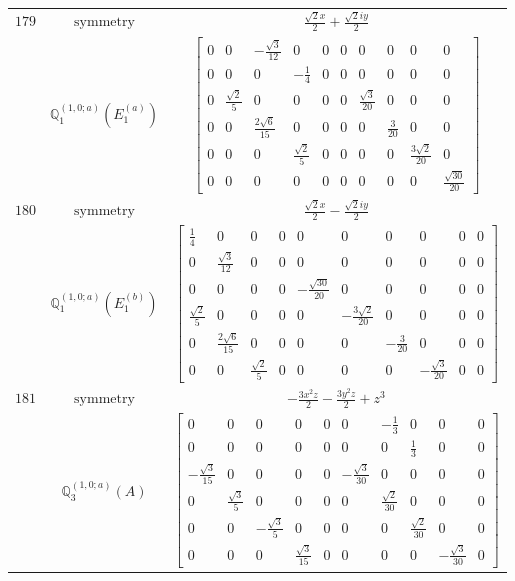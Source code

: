 \documentclass[fleqn,8pt,landscape]{jsarticle}
\begin{document}
\begin{longtable}{ccc}
$ 179 $ & $ \text{symmetry} $ & $ \frac{\sqrt{2} x}{2} + \frac{\sqrt{2} i y}{2} $ \\
$  $ & $ \mathbb{Q}_{1}^{(1,0;a)}(E_{1}^{(a)}) $ & $ \begin{bmatrix} 0 & 0 & - \frac{\sqrt{3}}{12} & 0 & 0 & 0 & 0 & 0 & 0 & 0 \\ 0 & 0 & 0 & - \frac{1}{4} & 0 & 0 & 0 & 0 & 0 & 0 \\ 0 & \frac{\sqrt{2}}{5} & 0 & 0 & 0 & 0 & \frac{\sqrt{3}}{20} & 0 & 0 & 0 \\ 0 & 0 & \frac{2 \sqrt{6}}{15} & 0 & 0 & 0 & 0 & \frac{3}{20} & 0 & 0 \\ 0 & 0 & 0 & \frac{\sqrt{2}}{5} & 0 & 0 & 0 & 0 & \frac{3 \sqrt{2}}{20} & 0 \\ 0 & 0 & 0 & 0 & 0 & 0 & 0 & 0 & 0 & \frac{\sqrt{30}}{20} \end{bmatrix} $ \\ \hline
$ 180 $ & $ \text{symmetry} $ & $ \frac{\sqrt{2} x}{2} - \frac{\sqrt{2} i y}{2} $ \\
$  $ & $ \mathbb{Q}_{1}^{(1,0;a)}(E_{1}^{(b)}) $ & $ \begin{bmatrix} \frac{1}{4} & 0 & 0 & 0 & 0 & 0 & 0 & 0 & 0 & 0 \\ 0 & \frac{\sqrt{3}}{12} & 0 & 0 & 0 & 0 & 0 & 0 & 0 & 0 \\ 0 & 0 & 0 & 0 & - \frac{\sqrt{30}}{20} & 0 & 0 & 0 & 0 & 0 \\ \frac{\sqrt{2}}{5} & 0 & 0 & 0 & 0 & - \frac{3 \sqrt{2}}{20} & 0 & 0 & 0 & 0 \\ 0 & \frac{2 \sqrt{6}}{15} & 0 & 0 & 0 & 0 & - \frac{3}{20} & 0 & 0 & 0 \\ 0 & 0 & \frac{\sqrt{2}}{5} & 0 & 0 & 0 & 0 & - \frac{\sqrt{3}}{20} & 0 & 0 \end{bmatrix} $ \\ \hline
$ 181 $ & $ \text{symmetry} $ & $ - \frac{3 x^{2} z}{2} - \frac{3 y^{2} z}{2} + z^{3} $ \\
$  $ & $ \mathbb{Q}_{3}^{(1,0;a)}(A) $ & $ \begin{bmatrix} 0 & 0 & 0 & 0 & 0 & 0 & - \frac{1}{3} & 0 & 0 & 0 \\ 0 & 0 & 0 & 0 & 0 & 0 & 0 & \frac{1}{3} & 0 & 0 \\ - \frac{\sqrt{3}}{15} & 0 & 0 & 0 & 0 & - \frac{\sqrt{3}}{30} & 0 & 0 & 0 & 0 \\ 0 & \frac{\sqrt{3}}{5} & 0 & 0 & 0 & 0 & \frac{\sqrt{2}}{30} & 0 & 0 & 0 \\ 0 & 0 & - \frac{\sqrt{3}}{5} & 0 & 0 & 0 & 0 & \frac{\sqrt{2}}{30} & 0 & 0 \\ 0 & 0 & 0 & \frac{\sqrt{3}}{15} & 0 & 0 & 0 & 0 & - \frac{\sqrt{3}}{30} & 0 \end{bmatrix} $ \\ \hline

\end{longtable}
\end{document}

